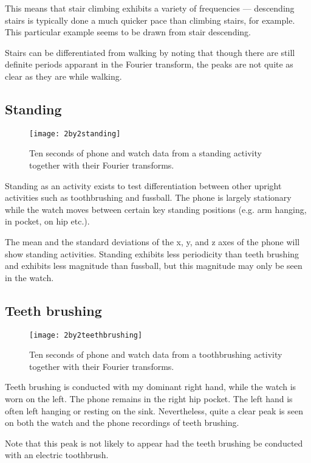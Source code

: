       This means that stair climbing exhibits a variety of frequencies --- descending stairs is typically done a much quicker pace than climbing stairs, for example. This particular example seems to be drawn from stair descending.
      
      Stairs can be differentiated from walking by noting that though there are still definite periods apparant in the Fourier transform, the peaks are not quite as clear as they are while walking.
    \pagebreak[4]
    \subsection{Standing}
      \begin{figure}[!th]
        \centering
        \texttt{[image: 2by2standing]}
        \caption{Ten seconds of phone and watch data from a standing activity together with their Fourier transforms.}
        \label{fig:2by2standing}
      \end{figure}
      Standing as an activity exists to test differentiation between other upright activities such as toothbrushing and fussball. The phone is largely stationary while the watch moves between certain key standing positions (e.g. arm hanging, in pocket, on hip etc.). 
      
      The mean and the standard deviations of the x, y, and z axes of the phone will show standing activities. Standing exhibits less periodicity than teeth brushing and exhibits less magnitude than fussball, but this magnitude may only be seen in the watch.
    \pagebreak[4]
    \subsection{Teeth brushing}
      \begin{figure}[!th]
        \centering
        \texttt{[image: 2by2teethbrushing]}
        \caption{Ten seconds of phone and watch data from a toothbrushing activity together with their Fourier transforms.}
        \label{fig:2by2teethbrushing}
      \end{figure}
      
      Teeth brushing is conducted with my dominant right hand, while the watch is worn on the left. The phone remains in the right hip pocket. The left hand is often left hanging or resting on the sink. Nevertheless, quite a clear peak is seen on both the watch and the phone recordings of teeth brushing.
      
      Note that this peak is not likely to appear had the teeth brushing be conducted with an electric toothbrush.
      
